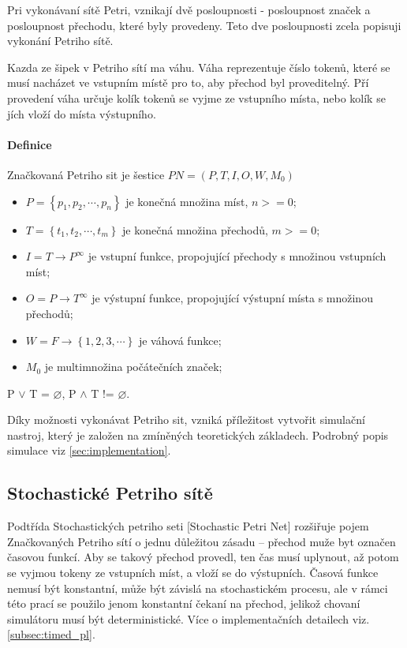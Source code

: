 Pri vykonávaní sítě Petri, vznikají dvě posloupnosti - posloupnost značek a posloupnost přechodu, které byly provedeny. Teto dve posloupnosti zcela popisuji vykonání Petriho sítě.

Kazda ze šipek v Petriho sítí ma váhu. Váha reprezentuje číslo tokenů, které se musí nacházet ve vstupním místě pro to, aby přechod byl proveditelný. Pří provedení váha určuje kolík tokenů se vyjme ze vstupního místa, nebo kolík se jích vloží do místa výstupního.

\paragraph{Definice}

Značkovaná Petriho sit je šestice $PN = \left(P, T, I, O, W, M_0\right)$
\begin{itemize}
  \item $P = \left\{p_1, p_2, \cdots , p_n\right\}$ je konečná množina míst, $n >= 0$; \\
  \item $T = \left\{t_1, t_2, \cdots , t_m\right\}$ je konečná množina přechodů, $m >= 0$; \\
  \item $I = T \rightarrow P^\infty$ je vstupní funkce, propojující přechody s množinou vstupních míst; \\
  \item $O = P \rightarrow T^\infty$ je výstupní funkce, propojující výstupní místa s množinou přechodů; \\
  \item $W = F \rightarrow \left\{1, 2, 3, \cdots \right\}$ je váhová funkce; \\
  \item $M_0$ je multimnožina počátečních značek;
\end{itemize}
P $\vee$ T = $\varnothing$, P $\wedge$ T != $\varnothing$.

Díky možnosti vykonávat Petriho sit, vzniká příležitost vytvořit simulační nastroj, který je založen na zmíněných teoretických základech. Podrobný popis simulace viz \ref{sec:implementation}.

\subsection{Stochastické Petriho sítě}
\label{subsec:timed-pn}

Podtřída Stochastických petriho seti [Stochastic Petri Net] rozšiřuje pojem Značkovaných Petriho sítí o jednu důležitou zásadu -- přechod muže byt označen časovou funkcí. Aby se takový přechod provedl, ten čas musí uplynout, až potom se vyjmou tokeny ze vstupních míst, a vloží se do výstupních. Časová funkce nemusí být konstantní, může být závislá na stochastickém procesu, ale v rámci této prací se použilo jenom konstantní čekaní na přechod, jelikož chovaní simulátoru musí být deterministické. Více o implementačních detailech viz. \ref{subsec:timed_pl}.

